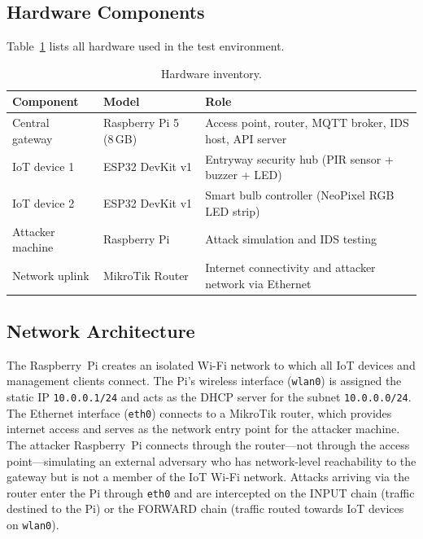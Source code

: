 \documentclass[12pt,a4paper]{article}
\begin{document}
\subsection{Hardware Components}
\label{sec:hardware}

Table~\ref{tab:hardware} lists all hardware used in the test environment.

\begin{table}[H]
\centering
\caption{Hardware inventory.}
\label{tab:hardware}
\begin{tabular}{llp{6.5cm}}
\toprule
\textbf{Component} & \textbf{Model} & \textbf{Role} \\
\midrule
Central gateway  & Raspberry Pi 5 (8\,GB) & Access point, router, MQTT broker, IDS host, API server \\
IoT device 1     & ESP32 DevKit v1        & Entryway security hub (PIR sensor + buzzer + LED) \\
IoT device 2     & ESP32 DevKit v1        & Smart bulb controller (NeoPixel RGB LED strip) \\
Attacker machine & Raspberry Pi           & Attack simulation and IDS testing \\
Network uplink   & MikroTik Router        & Internet connectivity and attacker network via Ethernet \\
\bottomrule
\end{tabular}
\end{table}

\subsection{Network Architecture}
\label{sec:network}

The Raspberry~Pi creates an isolated Wi-Fi network to which all IoT devices and management clients connect. The Pi's wireless interface (\texttt{wlan0}) is assigned the static IP \texttt{10.0.0.1/24} and acts as the DHCP server for the subnet \texttt{10.0.0.0/24}. The Ethernet interface (\texttt{eth0}) connects to a MikroTik router, which provides internet access and serves as the network entry point for the attacker machine. The attacker Raspberry~Pi connects through the router---not through the access point---simulating an external adversary who has network-level reachability to the gateway but is not a member of the IoT Wi-Fi network. Attacks arriving via the router enter the Pi through \texttt{eth0} and are intercepted on the INPUT chain (traffic destined to the Pi) or the FORWARD chain (traffic routed towards IoT devices on \texttt{wlan0}).
\end{document}
